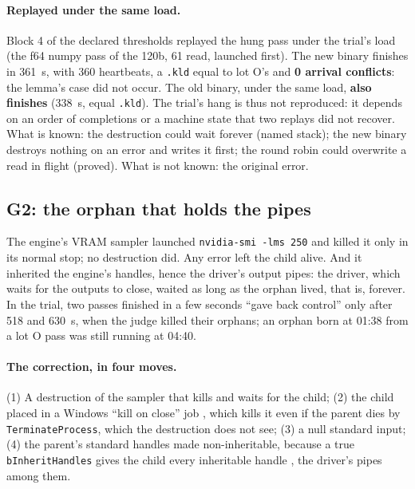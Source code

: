 \paragraph{Replayed under the same load.} Block 4 of the declared thresholds replayed the hung pass under the trial's load (the f64 numpy pass of the 120b, \SI{61}{\Go} read, launched first). The new binary finishes in \SI{361}{\second}, with 360 heartbeats, a \texttt{.kld} equal to lot O's and \textbf{0 arrival conflicts}: the lemma's case did not occur. The old binary, under the same load, \textbf{also finishes} (\SI{338}{\second}, equal \texttt{.kld}). The trial's hang is thus not reproduced: it depends on an order of completions or a machine state that two replays did not recover. What is known: the destruction could wait forever (named stack); the new binary destroys nothing on an error and writes it first; the round robin could overwrite a read in flight (proved). What is not known: the original error.

\subsection{G2: the orphan that holds the pipes}\label{t2e-sec:g2}

The engine's VRAM sampler launched \texttt{nvidia-smi -lms 250} and killed it only in its normal stop; no destruction did. Any error left the child alive. And it inherited the engine's handles, hence the driver's output pipes: the driver, which waits for the outputs to close, waited as long as the orphan lived, that is, forever. In the trial, two passes finished in a few seconds ``gave back control'' only after 518 and \SI{630}{\second}, when the judge killed their orphans; an orphan born at 01:38 from a lot O pass was still running at 04:40.

\paragraph{The correction, in four moves.} (1) A destruction of the sampler that kills and waits for the child; (2) the child placed in a Windows ``kill on close'' job \cite{ms-jobobject-limit}, which kills it even if the parent dies by \texttt{TerminateProcess}, which the destruction does not see; (3) a null standard input; (4) the parent's standard handles made non-inheritable, because a true \texttt{bInheritHandles} gives the child every inheritable handle \cite{ms-createprocess}, the driver's pipes among them.

